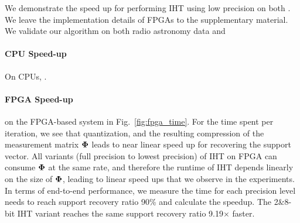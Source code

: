 \documentclass{article}
\begin{document}
We demonstrate the speed up for performing IHT 
using low precision on both .
We leave the implementation details of FPGAs to the
supplementary material. We validate our
algorithm on both radio astronomy data and

\paragraph*{CPU Speed-up} 
On CPUs, .

\paragraph*{FPGA Speed-up}

on the FPGA-based system in Fig.~\ref{fig:fpga_time}. For the time spent per iteration, we see that quantization, and the resulting compression of the measurement matrix ${\bf \Phi}$ leads to near linear speed up for recovering the support vector. All variants (full precision to lowest precision) of IHT on FPGA can consume ${\bf \Phi}$ at the same rate, and therefore the runtime of IHT depends linearly on the size of ${\bf \Phi}$, leading to linear speed ups that we observe in the experiments.
In terms of end-to-end performance, we measure the time for
each precision level needs to reach support recovery
ratio 90\% and calculate the speedup. The 2\&8-bit IHT variant reaches the same support recovery
ratio 9.19$\times$ faster.


\end{document}
